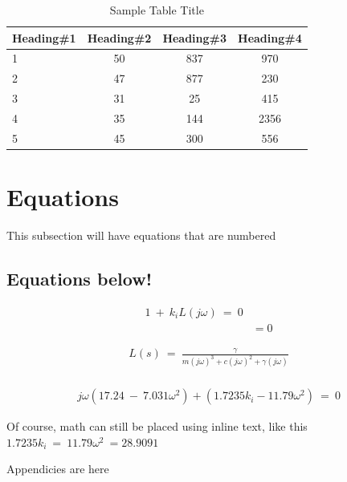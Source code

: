 \documentclass[12pt]{article} %
\begin{document}
\begin{table}[ht]
\caption{Sample Table Title} %
\centering %
\begin{tabular}{l | c c c} %
\hline\hline %
Heading\#1 & Heading\#2 & Heading\#3 & Heading\#4 \\ [0.5ex] %
\hline %
1 & 50 & 837 & 970 \\ %
2 & 47 & 877 & 230 \\
3 & 31 & 25 & 415 \\
4 & 35 & 144 & 2356 \\
5 & 45 & 300 & 556 \\ [1ex] %
\hline %
\end{tabular}
\label{table:nonlin} %
\end{table}

\clearpage

\section{Equations}

This subsection will have equations that are numbered

\subsection{Equations below!}

\begin{align}
1\:+\:k_iL\left(j\omega \right)\:=\:0\\
                          &= 0
\end{align} 

\begin{align}
L\left(s\right)\:=\:\frac{\gamma }{m\left(j\omega \right)^3+c\left(j\omega \right)^2+\gamma \left(j\omega \right)}\nonumber\\
\end{align}

\begin{align*}
j\omega \left(17.24\:-\:7.031\omega^2\right)+\left(1.7235k_i-11.79\omega ^2\right)\:=\:0
\end{align*} 

Of course, math can still be placed using inline text, like this $1.7235k_i\:=\:11.79\omega ^2\:=28.9091$

\clearpage

\appendixpage
\appendix

Appendicies are here
\end{document}
